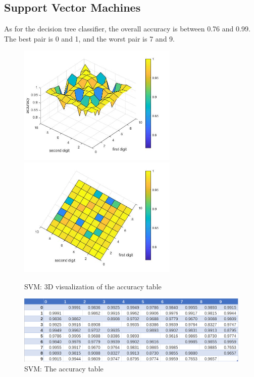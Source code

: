 \documentclass{article}
\begin{document}
\subsection{Support Vector Machines}
As for the decision tree classifier, the overall accuracy is between 0.76 and 0.99. The best pair is  0 and 1, and the worst pair is 7 and 9.
\begin{figure}[h]
    \centerline{\includegraphics[width=3in]{surf5.jpg}\includegraphics[width=3in]{surf6.jpg}}
    \caption{SVM: 3D visualization of the accuracy table}
\end{figure}
\begin{figure}[h]
    \centerline{\includegraphics[width=6in]{SVMtable.PNG}}
    \caption{SVM: The accuracy table}
\end{figure}

\newpage
\end{document}
